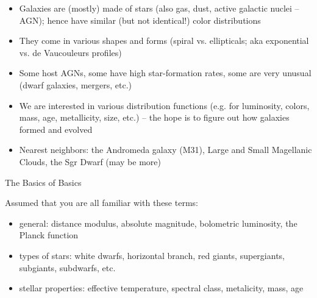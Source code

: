 \documentclass[letterpaper,landscape]{slides}
\begin{document}
\begin{slide}
{\begin{minipage}[t]{15cm}
\begin{itemize}
\item
Galaxies are (mostly) made of stars (also gas, dust, active galactic nuclei -- AGN); 
hence have similar (but not identical!) color distributions
\item
They come in various shapes and forms (spiral vs. ellipticals; aka exponential
vs. de Vaucouleurs profiles)
\item
Some host AGNs, some have high star-formation rates, some are very unusual
(dwarf galaxies, mergers, etc.)
\item
We are interested in various distribution functions (e.g. for 
luminosity, colors, mass, age, metallicity, size, etc.) -- the hope is to
figure out {\color{blue} how galaxies formed and evolved}
\item
Nearest neighbors: the Andromeda galaxy (M31), Large and Small Magellanic Clouds, 
the Sgr Dwarf (may be more)
\end{itemize}  

\end{minipage}}
\vfill 
\end{slide}


\begin{slide}
\begin{center}
{\large \color{red} 
                                The Basics of Basics
}
\end{center}


{\color{blue} Assumed that you are all familiar with these terms:}

\begin{itemize}
\item {\color{blue}general:} distance modulus, absolute magnitude, 
                             bolometric luminosity, the Planck function
\item {\color{blue}types of stars:} white dwarfs, horizontal branch, 
                           red giants, supergiants, subgiants, subdwarfs, etc.
\item {\color{blue}stellar properties:} effective temperature, spectral class, 
                           metalicity, mass, age 
\end{itemize}     
     
\vfill
\end{slide}


\end{document}
